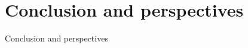 \documentclass[handout,10pt]{beamer}
\begin{document}
  

\section{Conclusion and perspectives}

\begin{frame}{}
\Large
\vfill
\begin{center}
    Conclusion and perspectives
\end{center}
\vfill

\end{frame}
\end{document}
